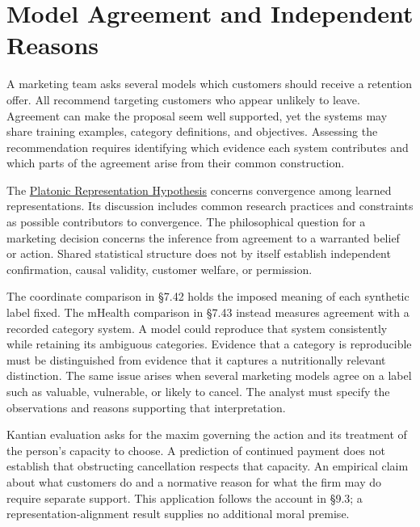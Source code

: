 
\hypertarget{M09-model-agreement-and-independent-reasons}{%
\section{Model Agreement and Independent
Reasons}\label{M09-model-agreement-and-independent-reasons}}

\noindent \noindent A marketing team asks several models which customers should
receive a retention offer. All recommend targeting customers who appear
unlikely to leave. Agreement can make the proposal seem well supported,
yet the systems may share training examples, category definitions, and
objectives. Assessing the recommendation requires identifying which
evidence each system contributes and which parts of the agreement arise
from their common construction.

The \href{https://arxiv.org/html/2405.07987v5}{Platonic Representation
Hypothesis} concerns convergence among learned representations. Its
discussion includes common research practices and constraints as
possible contributors to convergence. The philosophical question for a
marketing decision concerns the inference from agreement to a warranted
belief or action. Shared statistical structure does not by itself
establish independent confirmation, causal validity, customer welfare,
or permission.

The coordinate comparison in §7.42 holds the imposed meaning of each
synthetic label fixed. The mHealth comparison in §7.43 instead measures
agreement with a recorded category system. A model could reproduce that
system consistently while retaining its ambiguous categories. Evidence
that a category is reproducible must be distinguished from evidence that
it captures a nutritionally relevant distinction. The same issue arises
when several marketing models agree on a label such as valuable,
vulnerable, or likely to cancel. The analyst must specify the
observations and reasons supporting that interpretation.

Kantian evaluation asks for the maxim governing the action and its
treatment of the person's capacity to choose. A prediction of continued
payment does not establish that obstructing cancellation respects that
capacity. An empirical claim about what customers do and a normative
reason for what the firm may do require separate support. This
application follows the account in §9.3; a representation-alignment
result supplies no additional moral premise.

